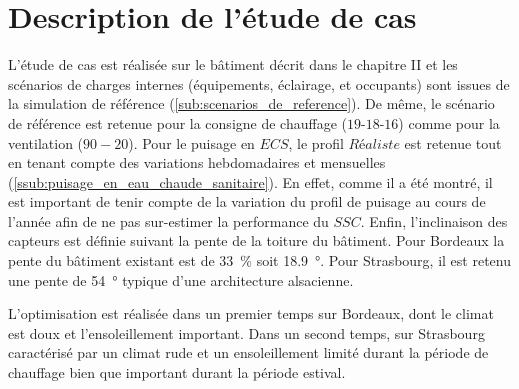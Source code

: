 



\section{Description de l’étude de cas} %
\label{sec:description_de_l_etude_de_cas}
L’étude de cas est réalisée sur le bâtiment décrit dans le chapitre II et les scénarios de
charges internes (équipements, éclairage, et occupants) sont issues de la simulation de
référence (\ref{sub:scenarios_de_reference}). De même, le scénario de référence est
retenue pour la consigne de chauffage ($19$-$18$-$16$) comme pour la ventilation
($90-20$). Pour le puisage en $ECS$, le profil $Réaliste$ est retenue tout en tenant
compte des variations hebdomadaires et mensuelles
(\ref{ssub:puisage_en_eau_chaude_sanitaire}). En effet, comme il a été montré, il est
important de tenir compte de la variation du profil de puisage au cours de l’année afin de
ne pas sur-estimer la performance du $SSC$. Enfin, l’inclinaison des capteurs est définie
suivant la pente de la toiture du bâtiment. Pour Bordeaux la pente du bâtiment existant
est de \SI{33}{\percent} soit \SI{18.9}{\degree}. Pour Strasbourg, il est retenu une pente
de \SI{54}{\degree} typique d’une architecture alsacienne.

L’optimisation est réalisée dans un premier temps sur Bordeaux, dont le climat
est doux et l’ensoleillement important. Dans un second temps, sur Strasbourg caractérisé
par un climat rude et un ensoleillement limité durant la période de chauffage bien que
important durant la période estival.

